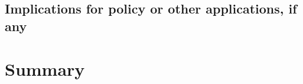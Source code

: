 \documentclass[pdftex,12pt]{llncs}
\begin{document}
\subsection{Implications for policy or other applications, if any}


\section{Summary}

%
%

%
%
%
\end{document}
